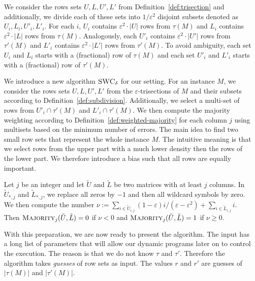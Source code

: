 \begin{definition}
    We consider the rows sets $U, L, U', L'$ from Definition~\ref{def:trisection} and additionally, we divide each of these sets into $1/\varepsilon^2$ disjoint subsets denoted as $U_i, L_i, U'_i, L'_i$.
    For each $i$, $U_i$ contains $\varepsilon^2 \cdot |U|$ rows from $\tau(M)$ and $L_i$ contains $\varepsilon^2 \cdot |L|$ rows from $\tau(M)$.
    Analogously, each $U'_i$ contains $\varepsilon^2 \cdot |U'|$ rows from $\tau'(M)$ and $L'_i$ contains $\varepsilon^2 \cdot |L'|$ rows from $\tau'(M)$.
    To avoid ambiguity, each set $U_i$ and $L_i$ starts with a (fractional) row of $\tau(M)$ and each set $U'_i$ and $L'_i$ starts with a (fractional) row of $\tau'(M)$. 
    \label{def:subdivision}
\end{definition}


We introduce a new algorithm $\textsc{SWC}_\delta$ for our setting.
For an instance $M$, we consider the rows sets $U, L, U', L'$ from the $\varepsilon$-trisections of $M$ and their subsets according to Definition~\ref{def:subdivision}.
Additionally, we select a multi-set of rows from $U'_i \cap \tau'(M)$ and $L'_i \cap \tau'(M)$.
We then compute the majority weighting according to Definition~\ref{def:weighted-majority} for each column $j$ using 
multisets based on the minimum number of errors.
The main idea to find two small row sets that represent the whole instance $M$.
The intuitive meaning is that we select rows from the upper part with a much lower density then the rows of the lower part.
We therefore introduce a bias such that all rows are equally important.

\begin{definition}
    Let $j$ be an integer and let $\tilde{U}$ and $\tilde{L}$ be two matrices with at least $j$ columns.
    In $\tilde{U}_{*,j}$ and $\tilde{L}_{*,j}$, we replace all zeros by $-1$ and then all wildcard symbols by zero.
    We then compute the number
    $\nu := \sum_{i \in \tilde{U}_{i,j}} (1-\varepsilon)i/(\varepsilon - \varepsilon^2) + \sum_{i \in \tilde{L}_{i,j}} i$. 
    Then $\textsc{Majority}_j(\tilde{U}, \tilde{L}) = 0$ if $\nu <0$ and $\textsc{Majority}_j(\tilde{U}, \tilde{L}) = 1$ if $\nu \ge 0$.
    \label{def:weighted-majority}
\end{definition}
With this preparation, we are now ready to present the algorithm.
The input has a long list of parameters that will allow our dynamic programs later on to control the execution.
The reason is that we do not know $\tau$ and $\tau'$. 
Therefore the algorithm takes \emph{guesses} of row sets as input.
The values $r$ and $r'$ are guesses of $|\tau(M)|$ and $|\tau'(M)|$.
\smallskip

